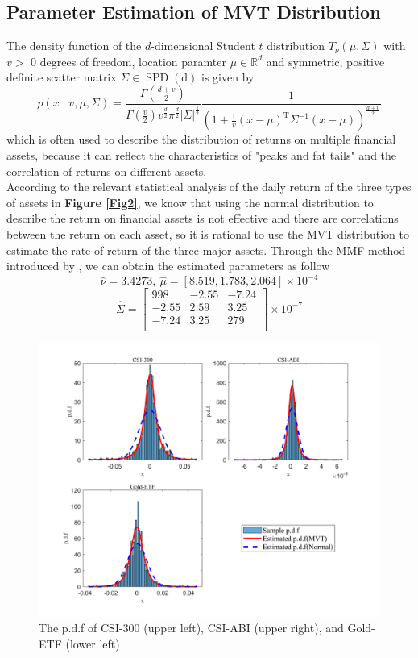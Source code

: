 \subsection{Parameter Estimation of MVT Distribution}
The density function of the $d$-dimensional Student $t$ distribution $T_\nu(\mu, \Sigma)$ with $v>$ 0 degrees of freedom, location paramter $\mu \in \mathbb{R}^d$ and symmetric, positive definite scatter matrix $\Sigma \in \operatorname{SPD}(\mathrm{d})$ is given by
\begin{equation} \label{E1.1}
p(x \mid v, \mu, \Sigma)=\frac{\Gamma\left(\frac{d+v}{2}\right)}{\Gamma\left(\frac{v}{2}\right) v^{\frac{d}{2}} \pi^{\frac{d}{2}}|\Sigma|^{\frac{1}{2}}} \frac{1}{\left(1+\frac{1}{v}(x-\mu)^{\mathrm{T}} \Sigma^{-1}(x-\mu)\right)^{\frac{d+v}{2}}}
\end{equation}
which is often used to describe the distribution of returns on multiple financial assets, because it can reflect the characteristics of "peaks and fat tails" and the correlation of returns on different assets.
\\ \noindent According to the relevant statistical analysis of the daily return of the three types of assets in \textbf{Figure \ref{Fig2}}, we know that using the normal distribution to describe the return on financial assets is not effective and there are correlations between the return on each asset, so it is rational to use the MVT distribution to estimate the rate of return of the three major assets. Through the MMF method introduced by \cite{hasannasab2021alternatives}, we can obtain the estimated parameters as follow
$$
\hat{\nu}=3.4273,\:\hat{\mu}=[8.519,1.783,2.064]\times 10^{-4}
$$
$$
\hat{\Sigma}=\begin{bmatrix}
  998 &  -2.55 &  -7.24 \\
 -2.55 &   2.59 &   3.25 \\
 -7.24 &   3.25 &   279 \\    
\end{bmatrix} \times 10^{-7}
$$
\begin{figure}[H]
    \centering
    \includegraphics[scale=0.8]{Figure/FIG3-PDF.png}
    \caption{The p.d.f of CSI-300 (upper left), CSI-ABI (upper right), and
Gold-ETF (lower left)}
    \label{Fig3}
\end{figure}
